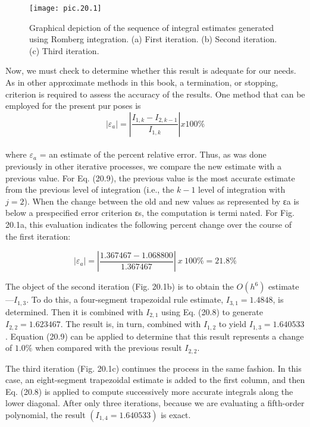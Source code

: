 \begin{figure}[hbt!]
	\centering
	\texttt{[image: pic.20.1]}
	\caption{\textsf{Graphical depiction of the sequence of integral estimates generated using Romberg integration.
(a) First iteration. (b) Second iteration. (c) Third iteration.}} \hline
	\label{pic.20.1}
\end{figure}
\vspace{0.3}

Now, we must check to determine whether this result is adequate for our needs. As in
other approximate methods in this book, a termination, or stopping, criterion is required to
assess the accuracy of the results. One method that can be employed for the present purposes is
\begin{equation}
	\tag{20.9}
	|\varepsilon_a|=\left|\dfrac{I_{1,k}-I_{2,k-1}}{I_{1,k}} \right| x100\%
\end{equation}\\
where $\varepsilon_a$ = an estimate of the percent relative error. Thus, as was done previously in other
iterative processes, we compare the new estimate with a previous value. For Eq. (20.9), the
previous value is the most accurate estimate from the previous level of integration (i.e., the
$k − 1$ level of integration with $j = 2$). When the change between the old and new values
as represented by εa is below a prespecified error criterion εs, the computation is terminated. For Fig. 20.1a, this evaluation indicates the following percent change over the
course of the first iteration:

	$$|\varepsilon_a|= \left|\dfrac{1.367467 − 1.068800}{1.367467} \right| \: x \: 100\% = 21.8\%$$
	
The object of the second iteration (Fig. 20.1b) is to obtain the $O(h^6)$ estimate—$I_{1,3}$.
To do this, a four-segment trapezoidal rule estimate, $I_{3,1} = 1.4848$, is determined. Then it
is combined with $I_{2,1}$ using Eq. (20.8) to generate $I_{2,2} = 1.623467$. The result is, in turn,
combined with $I_{1,2}$ to yield $I_{1,3} = 1.640533$. Equation (20.9) can be applied to determine
that this result represents a change of $1.0\%$ when compared with the previous result $I_{2,2}$.

The third iteration (Fig. 20.1c) continues the process in the same fashion. In this case,
an eight-segment trapezoidal estimate is added to the first column, and then Eq. (20.8) is
applied to compute successively more accurate integrals along the lower diagonal. After
only three iterations, because we are evaluating a fifth-order polynomial, the result
$(I_{1,4} = 1.640533)$ is exact.

